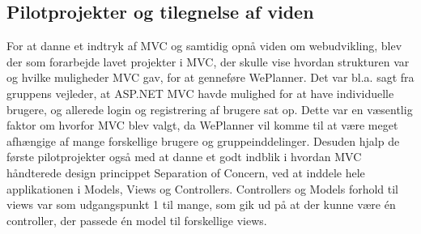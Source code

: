 \subsection{Pilotprojekter og tilegnelse af viden}
For at danne et indtryk af MVC og samtidig opnå viden om webudvikling, blev der som forarbejde lavet projekter i MVC, der skulle vise hvordan strukturen var og hvilke muligheder MVC gav, for at genneføre WePlanner. Det var bl.a. sagt fra gruppens vejleder, at ASP.NET MVC havde mulighed for at have individuelle brugere, og allerede login og registrering af brugere sat op. Dette var en væsentlig faktor om hvorfor MVC blev valgt, da WePlanner vil komme til at være meget afhængige af mange forskellige brugere og gruppeinddelinger. Desuden hjalp de første pilotprojekter også med at danne et godt indblik i hvordan MVC håndterede design princippet Separation of Concern\cite{separationOfConcern}, ved at inddele hele applikationen i Models, Views og Controllers. Controllers og Models forhold til views var som udgangspunkt 1 til mange, som gik ud på at der kunne være én controller, der passede én model til forskellige views.

